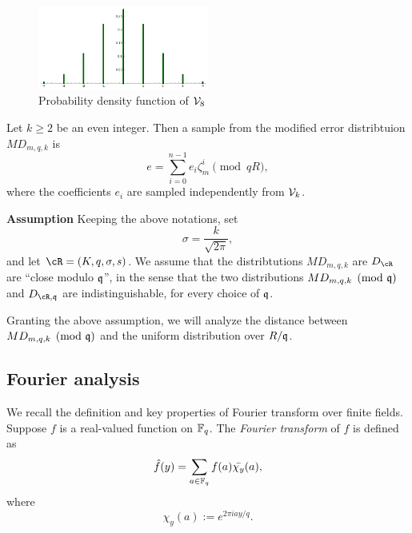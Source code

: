 \documentclass{amsart}
\begin{document}
\begin{figure}[h!]
\centering
\includegraphics[width = 0.5\textwidth]{v8.png}
\caption{Probability density function of $\mathcal{V}_8$}
\end{figure}


\begin{Definition}
Let $k \geq 2$ be an even integer. Then a sample from the modified error distribtuion $MD_{m,q,k}$ is
\[
    e = \sum_{i=0}^{n-1} e_i \zeta_m^{i} \pmod{qR},
\]
where the coefficients $e_i$ are sampled independently from $\mathcal{V}_k$.
\end{Definition}

{\bf Assumption} Keeping the above notations, set
$$
    \sigma = \frac{k}{\sqrt{2 \pi}},
$$ and
let $\cR = (K, q, \sigma, s)$. We assume that the distribtutions $MD_{m,q,k}$ are $D_\cR$ are ``close modulo $\mathfrak{q}$'', in the sense that the two distributions $MD_{m,q,k} \pmod{\mathfrak{q}}$ and
$D_{\cR,\fq}$ are indistinguishable, for every choice of $\mathfrak{q}$.

Granting the above assumption, we will analyze the distance between $MD_{m,q,k} \pmod{\mathfrak{q}}$ and the uniform distribution over $R/\mathfrak{q}$.

\subsection{Fourier analysis}
We recall the definition and key properties of Fourier transform over finite fields.
Suppose $f$ is a real-valued function on $\mathbb{F}_q$. The {\it Fourier transform} of $f$ is defined as
\[
    \hat{f}(y) = \sum_{a \in \mathbb{F}_q} f(a) \bar{\chi_y}(a),
\]
where $$\chi_y(a) := e^{2 \pi i ay/q}.$$
\end{document}
